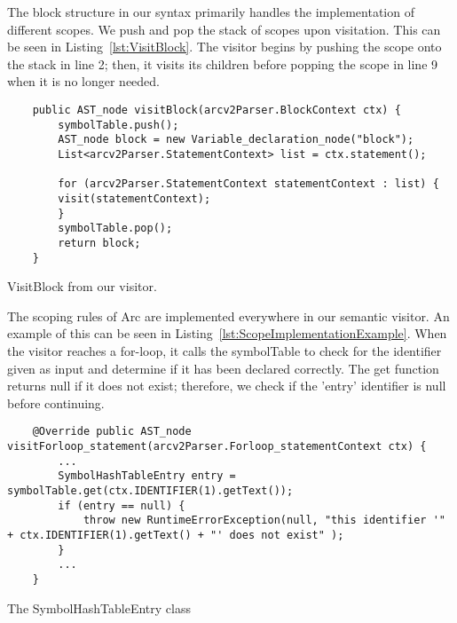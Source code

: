 


The block structure in our syntax primarily handles the implementation of different scopes. We push and pop the stack of scopes upon visitation. This can be seen in Listing~\ref{lst:VisitBlock}. The visitor begins by pushing the scope onto the stack in line 2; then, it visits its children before popping the scope in line 9 when it is no longer needed.


\begin{listing}[htb!]
    \begin{verbatim}
    public AST_node visitBlock(arcv2Parser.BlockContext ctx) {
        symbolTable.push();
        AST_node block = new Variable_declaration_node("block");
        List<arcv2Parser.StatementContext> list = ctx.statement();

        for (arcv2Parser.StatementContext statementContext : list) {
        visit(statementContext);   
        }
        symbolTable.pop();
        return block;
    }
    \end{verbatim}
    \caption{VisitBlock from our visitor.}
    \label{lst:VisitBlock}
\end{listing}


The scoping rules of Arc are implemented everywhere in our semantic visitor. An example of this can be seen in Listing~\ref{lst:ScopeImplementationExample}. When the visitor reaches a for-loop, it calls the symbolTable to check for the identifier given as input and determine if it has been declared correctly. The get function returns null if it does not exist; therefore, we check if the 'entry' identifier is null before continuing.


\begin{listing}[htb!]
    \begin{verbatim}
    @Override public AST_node visitForloop_statement(arcv2Parser.Forloop_statementContext ctx) { 
        ...
        SymbolHashTableEntry entry = symbolTable.get(ctx.IDENTIFIER(1).getText());
        if (entry == null) {
            throw new RuntimeErrorException(null, "this identifier '" + ctx.IDENTIFIER(1).getText() + "' does not exist" );
        }
        ...
    }
    \end{verbatim}
    \caption{The SymbolHashTableEntry class}
    \label{lst:ScopeImplementationExample}
\end{listing}